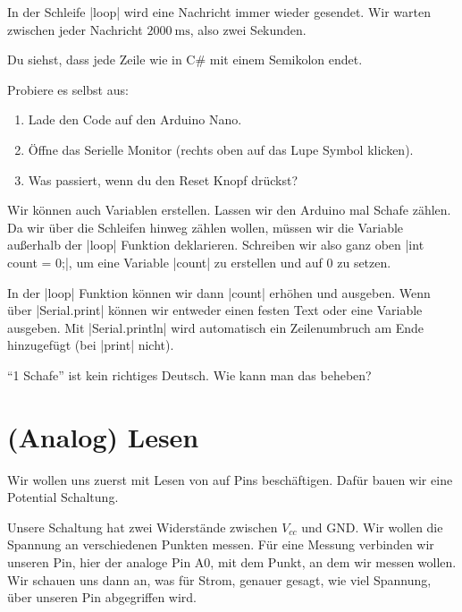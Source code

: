 \documentclass[a4paper,12pt]{book}
\begin{document}
In der Schleife |loop| wird eine Nachricht immer wieder gesendet.
Wir warten zwischen jeder Nachricht $\SI{2000}{\milli\second}$, also zwei Sekunden.

Du siehst, dass jede Zeile wie in C\# mit einem Semikolon endet.

\begin{instruction}
  Probiere es selbst aus:
  \begin{enumerate}
    \item Lade den Code auf den Arduino Nano.
    \item Öffne das Serielle Monitor (rechts oben auf das Lupe Symbol klicken).
    \item Was passiert, wenn du den Reset Knopf drückst?
  \end{enumerate}
\end{instruction}

Wir können auch Variablen erstellen.
Lassen wir den Arduino mal Schafe zählen.
Da wir über die Schleifen hinweg zählen wollen, müssen wir die Variable außerhalb der |loop| Funktion deklarieren.
Schreiben wir also ganz oben |int count = 0;|, um eine Variable |count| zu erstellen und auf $0$ zu setzen.

In der |loop| Funktion können wir dann |count| erhöhen und ausgeben.
Wenn über |Serial.print| können wir entweder einen festen Text oder eine Variable ausgeben.
Mit |Serial.println| wird automatisch ein Zeilenumbruch am Ende hinzugefügt (bei |print| nicht).



\begin{instruction}
  \enquote{1 Schafe} ist kein richtiges Deutsch.
  Wie kann man das beheben?
\end{instruction}


\section*{(Analog) Lesen}
Wir wollen uns zuerst mit Lesen von auf Pins beschäftigen.
Dafür bauen wir eine Potential Schaltung.


Unsere Schaltung hat zwei Widerstände zwischen $V_{cc}$ und GND.
Wir wollen die Spannung an verschiedenen Punkten messen.
Für eine Messung verbinden wir unseren Pin, hier der analoge Pin A0, mit dem Punkt, an dem wir messen wollen.
Wir schauen uns dann an, was für Strom, genauer gesagt, wie viel Spannung, über unseren Pin abgegriffen wird.
\end{document}

